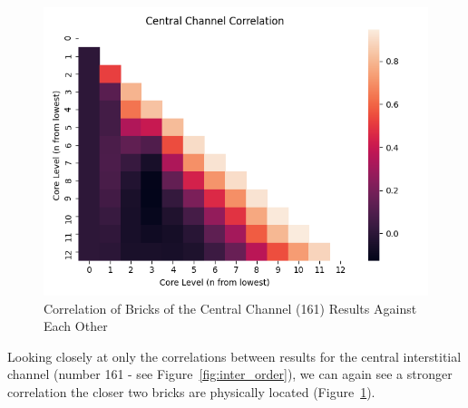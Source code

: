 \begin{figure}[h]
	\centering
	\includegraphics[scale=0.75]{Figures/central_channel_correlation.png}
	\caption{Correlation of Bricks of the Central Channel (161) Results Against Each Other}
	\label{fig:central_correlations}
\end{figure}


\noindent
Looking closely at only the correlations between results for the central interstitial channel (number 161 - see Figure~\ref{fig:inter_order}), we can again see a stronger correlation the closer two bricks are physically located (Figure~\ref{fig:central_correlations}).